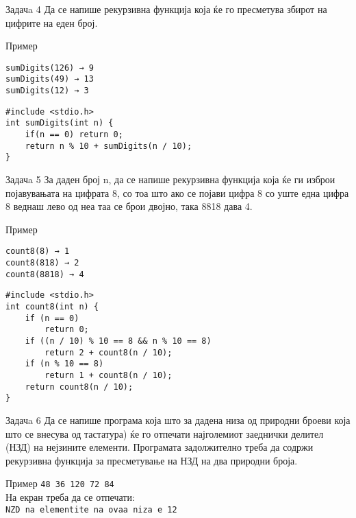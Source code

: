 \begin{frame}[fragile]{Задачa 4}
Да се напише рекурзивна функција која ќе го пресметува збирот на цифрите на еден
број.
\begin{exampleblock}{Пример}
\begin{verbatim}
sumDigits(126) → 9
sumDigits(49) → 13
sumDigits(12) → 3
\end{verbatim}
\end{exampleblock}
\pause
\begin{lstlisting}
#include <stdio.h>
int sumDigits(int n) {
    if(n == 0) return 0;
    return n % 10 + sumDigits(n / 10);
}
\end{lstlisting}
\end{frame}

\begin{frame}[fragile]{Задачa 5}
За даден број n, да се напише рекурзивна функција која ќе ги изброи појавувањата
на цифрата 8, со тоа што ако се појави цифра 8 со уште една цифра 8 веднаш лево
од неа таа се брои двојно, така 8818 дава 4.
\begin{exampleblock}{Пример}
\begin{verbatim}
count8(8) → 1
count8(818) → 2
count8(8818) → 4
\end{verbatim}
\end{exampleblock}
\pause
\begin{lstlisting}
#include <stdio.h>
int count8(int n) {
    if (n == 0)
        return 0;
    if ((n / 10) % 10 == 8 && n % 10 == 8)
        return 2 + count8(n / 10);
    if (n % 10 == 8)
        return 1 + count8(n / 10);
    return count8(n / 10);
}
\end{lstlisting}
\end{frame}


\begin{frame}{Задачa 6}
Да се напише програма која што за дадена низа од природни броеви  која што се
внесува од тастатура) ќе го отпечати најголемиот заеднички делител (НЗД) на
нејзините елементи.  Програмата задолжително треба да содржи рекурзивна функција
за пресметување на НЗД на два природни броја.
\begin{exampleblock}{Пример}
\texttt{48 36 120 72 84}\\
На екран треба да се отпечати:\\
\texttt{NZD na elementite na ovaa niza e 12}
\end{exampleblock}
\end{frame}

